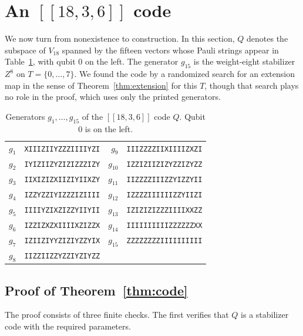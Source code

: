 \documentclass[11pt]{article}
\theoremstyle{definition}
\theoremstyle{remark}
\newcommand{\qc}[1]{[\![#1]\!]}
\begin{document}
\section{An \texorpdfstring{\(\qc{18,3,6}\)}{[[18,3,6]]} code}\label{sec:code}

We now turn from nonexistence to construction. In this section, \(Q\)
denotes the subspace of \(V_{18}\) spanned by the fifteen vectors whose
Pauli strings appear in Table~\ref{tab:gens}, with qubit \(0\) on the
left. The generator \(g_{15}\) is the weight-eight stabilizer \(Z^8\) on
\(T=\{0,\ldots,7\}\). We found the code by a randomized search for an
extension map in the sense of Theorem~\ref{thm:extension} for this
\(T\), though that search plays no role in the proof, which uses only
the printed generators.

\begin{table}[htbp]
\centering\small
\caption{Generators \(g_1,\ldots,g_{15}\) of the \(\qc{18,3,6}\) code
\(Q\). Qubit \(0\) is on the left.}\label{tab:gens}
\begin{tabular}{@{}rl@{\qquad}rl@{}}\toprule
\(g_1\)&\texttt{XIIIZIIYZZZIIIIYZI}&\(g_9\)&\texttt{IIIZZZZIIXIIIIZXZI}\\
\(g_2\)&\texttt{IYIZIIZYZIZIZZZIZY}&\(g_{10}\)&\texttt{IZZIZIIZIZYZZIZYZZ}\\
\(g_3\)&\texttt{IIXIZIZXIIZIYIIXZY}&\(g_{11}\)&\texttt{IIZZZZIIIZZYIZZYII}\\
\(g_4\)&\texttt{IZZYZZIYIZZZIZIIII}&\(g_{12}\)&\texttt{IZZZZIIIIIIZZYIIZI}\\
\(g_5\)&\texttt{IIIIYZIXZIZZYIIYII}&\(g_{13}\)&\texttt{IZIZIZIZZZIIIIXXZZ}\\
\(g_6\)&\texttt{IZZIZXZXIIIIXZIZZX}&\(g_{14}\)&\texttt{IIIIIIIIIIZZZZZZXX}\\
\(g_7\)&\texttt{IZIIZIYYZIZIYZZYIX}&\(g_{15}\)&\texttt{ZZZZZZZZIIIIIIIIII}\\
\(g_8\)&\texttt{IIZZIIZZYZZIYZIYZZ}&&\\\bottomrule
\end{tabular}
\end{table}

\subsection{Proof of Theorem~\ref{thm:code}}

The proof consists of three finite checks. The first verifies that \(Q\)
is a stabilizer code with the required parameters.
\end{document}
